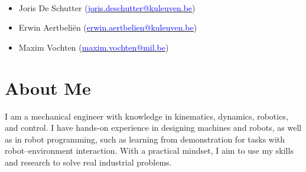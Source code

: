 \documentclass[lighthipster]{simplehipstercv}
\begin{document}
\begin{paracol}{2}
{			\bigskip
			\bigskip
			\bigskip
			\bigskip
			
			\\[0.5em]
			\begin{itemize}[leftmargin=1em, itemsep=0pt, topsep=0pt]
				\item Joris De Schutter (\href{mailto:joris.deschutter@kuleuven.be}{\textcolor{blue}{joris.deschutter@kuleuven.be}})
				\item Erwin Aertbeli\"en (\href{mailto:erwin.aertbelien@kuleuven.be}{\textcolor{blue}{erwin.aertbelien@kuleuven.be}})
				\item Maxim Vochten (\href{mailto:maxim.vochten@mil.be}{\textcolor{blue}{maxim.vochten@mil.be}})
			\end{itemize}
			\vspace{0em} %
			
			
		}
		\switchcolumn
		
		\small
		
		\section*{About Me}
		\large I am a mechanical engineer with knowledge in kinematics, dynamics, robotics, and control. I have hands-on experience in designing machines and robots, as well as in robot programming, such as learning from demonstration for tasks with robot–environment interaction. With a practical mindset, I aim to use my skills and research to solve real industrial problems. \vspace{-0.3cm}


\end{paracol}
\end{document}
